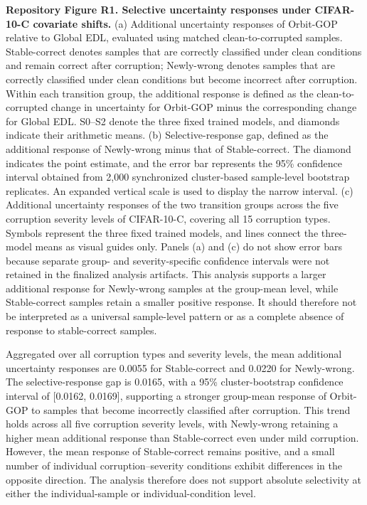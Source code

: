 \documentclass[11pt,a4paper]{article}
\begin{document}
\textbf{Repository Figure R1. Selective uncertainty responses under CIFAR-10-C covariate shifts.} (a) Additional uncertainty responses of Orbit-GOP relative to Global EDL, evaluated using matched clean-to-corrupted samples. Stable-correct denotes samples that are correctly classified under clean conditions and remain correct after corruption; Newly-wrong denotes samples that are correctly classified under clean conditions but become incorrect after corruption. Within each transition group, the additional response is defined as the clean-to-corrupted change in uncertainty for Orbit-GOP minus the corresponding change for Global EDL. S0--S2 denote the three fixed trained models, and diamonds indicate their arithmetic means. (b) Selective-response gap, defined as the additional response of Newly-wrong minus that of Stable-correct. The diamond indicates the point estimate, and the error bar represents the 95\% confidence interval obtained from 2,000 synchronized cluster-based sample-level bootstrap replicates. An expanded vertical scale is used to display the narrow interval. (c) Additional uncertainty responses of the two transition groups across the five corruption severity levels of CIFAR-10-C, covering all 15 corruption types. Symbols represent the three fixed trained models, and lines connect the three-model means as visual guides only. Panels (a) and (c) do not show error bars because separate group- and severity-specific confidence intervals were not retained in the finalized analysis artifacts. This analysis supports a larger additional response for Newly-wrong samples at the group-mean level, while Stable-correct samples retain a smaller positive response. It should therefore not be interpreted as a universal sample-level pattern or as a complete absence of response to stable-correct samples.

Aggregated over all corruption types and severity levels, the mean additional uncertainty responses are 0.0055 for Stable-correct and 0.0220 for Newly-wrong. The selective-response gap is 0.0165, with a 95\% cluster-bootstrap confidence interval of {[}0.0162, 0.0169{]}, supporting a stronger group-mean response of Orbit-GOP to samples that become incorrectly classified after corruption. This trend holds across all five corruption severity levels, with Newly-wrong retaining a higher mean additional response than Stable-correct even under mild corruption. However, the mean response of Stable-correct remains positive, and a small number of individual corruption--severity conditions exhibit differences in the opposite direction. The analysis therefore does not support absolute selectivity at either the individual-sample or individual-condition level.
\end{document}
